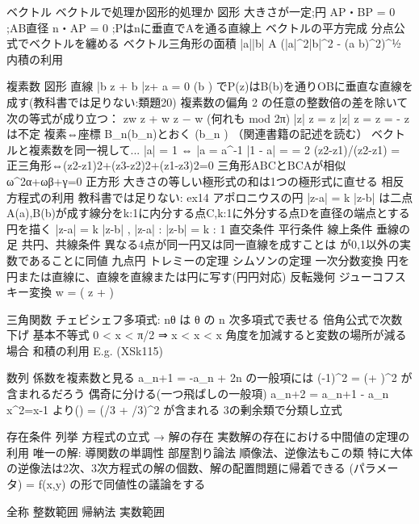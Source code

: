 \documentclass[dvipdfmx,uplatex]{jsarticle}
\begin{document}
ベクトル
ベクトルで処理か図形的処理か
図形
大きさが一定;円
AP・BP = 0 ;AB直径
n・AP = 0 ;Pはnに垂直でAを通る直線上
ベクトルの平方完成
分点公式でベクトルを纏める
ベクトル三角形の面積
|a||b| \sin A
(|a|^2|b|^2 - (a \cdot b)^2)^{½}
内積の利用

複素数
図形
直線
\bar{b} z + b \bar{z}+ a = 0 (b ) でP(z)はB(b)を通りOBに垂直な直線を成す(教科書では足りない:類題20)
複素数の偏角
2 \pi の任意の整数倍の差を除いて次の等式が成り立つ：
\arg zw \equiv \arg z + \arg w
\arg {} \equiv \arg z − \arg w
(何れも mod 2π)
|z| \cos \arg z =  z
|z| \sin \arg z =  z
\arg {} = - \arg z
 は不定
複素⇔座標
B_n(b_n)とおく (b_n \in {})
（関連書籍の記述を読む）
ベクトルと複素数を同一視して...
|a| = 1 ⇔ \bar{a} = a^{-1} 
|1 - a| =  = 2 \sin {}
(z2-z1)/(z2-z1) =
正三角形⇔(z2-z1)2+(z3-z2)2+(z1-z3)2=0
三角形ABCとBCAが相似
ω^2α+ωβ+γ=0
正方形
大きさの等しい極形式の和は1つの極形式に直せる
相反方程式の利用
教科書では足りない:
ex14
アポロニウスの円
|z-a| = k |z-b| は二点A(a),B(b)が成す線分をk:1に内分する点C,k:1に外分する点Dを直径の端点とする円を描く
 |z-a| = k |z-b| , |z-a| : |z-b| = k : 1
直交条件
平行条件
線上条件
垂線の足
共円、共線条件
異なる4点が同一円又は同一直線を成すことは  \cdot {}が0,1以外の実数であることに同値
九点円
トレミーの定理
シムソンの定理
一次分数変換
円を円または直線に、直線を直線または円に写す(円円対応)
反転幾何
ジューコフスキー変換
w =  \left( z +  \right)

三角関数
チェビシェフ多項式: \cos nθ は \cos θ の n 次多項式で表せる
倍角公式で次数下げ
基本不等式
0 < x < π/2 ⇒ \sin x < x < \tan x
角度を加減すると変数の場所が減る場合
和積の利用
E.g. (XSk115)

数列
係数を複素数と見る
a_{n+1} = -a_n + 2n の一般項には (-1)^2 = (\cos \pi + \sin \pi)^2 が含まれるだろう
偶奇に分ける(一つ飛ばしの一般項)
a_{n+2} = a_{n+1} - a_n
x^2=x-1 より\left(\right) = (\cos \pi/3 + \sin \pi/3)^2 が含まれる
3の剰余類で分類し立式

存在条件
列挙
方程式の立式 → 解の存在
実数解の存在における中間値の定理の利用
唯一の解: 導関数の単調性
部屋割り論法
順像法、逆像法もこの類
特に大体の逆像法は2次、3次方程式の解の個数、解の配置問題に帰着できる
(パラメータ) = f(x,y) の形で同値性の議論をする

全称
整数範囲
帰納法
実数範囲
\end{document}
